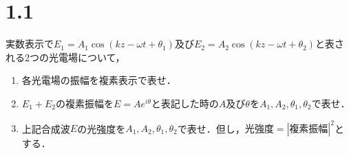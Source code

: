 \section*{1.1}
実数表示で$E_1=A_1\cos(kz-\omega t+\theta_1)$及び$E_2=A_2\cos(kz-\omega t+\theta_2)$と表される2つの光電場について，
\begin{enumerate}
    \renewcommand{\labelenumi}{(\alph{enumi})}
    \item 各光電場の振幅を複素表示で表せ．
    \item $E_1+E_2$の複素振幅を$E=Ae^{i\theta}$と表記した時の$A$及び$\theta$を$A_1,A_2,\theta_1,\theta_2$で表せ．
    \item 上記合成波$E$の光強度を$A_1,A_2,\theta_1,\theta_2$で表せ．但し，$光強度=|複素振幅|^2$とする．
\end{enumerate}

